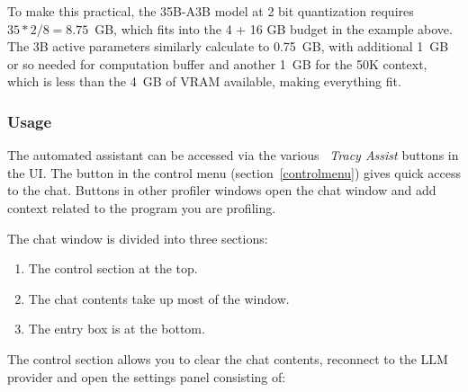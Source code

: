 \documentclass[hidelinks,titlepage,a4paper,twoside]{article}
\begin{document}
To make this practical, the 35B-A3B model at 2 bit quantization requires $35 * 2 / 8 = 8.75$~GB, which fits into the 4 + 16 GB budget in the example above. The 3B active parameters similarly calculate to 0.75~GB, with additional 1~GB or so needed for computation buffer and another 1~GB for the 50K context, which is less than the 4~GB of VRAM available, making everything fit.

\subsubsection{Usage}
\label{llmusage}

The automated assistant can be accessed via the various \emph{\faRobot{}~Tracy Assist} buttons in the UI. The button in the control menu (section~\ref{controlmenu}) gives quick access to the chat. Buttons in other profiler windows open the chat window and add context related to the program you are profiling.

The chat window is divided into three sections:

\begin{enumerate}
\item The control section at the top.
\item The chat contents take up most of the window.
\item The entry box is at the bottom.
\end{enumerate}

The control section allows you to clear the chat contents, reconnect to the LLM provider and open the settings panel consisting of:
\end{document}
